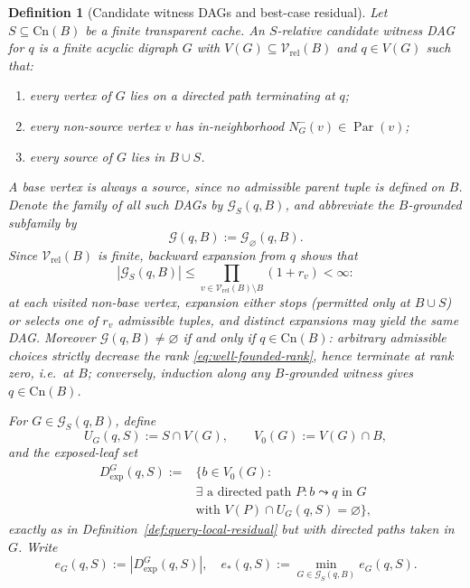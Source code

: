 \documentclass[journal]{IEEEtran}
\newcommand{\Cn}{\text{Cn}}
\newtheorem{definition}{Definition}[section]
\numberwithin{equation}{section}
\begin{document}
\begin{definition}[Candidate witness DAGs and best-case residual]
\label{def:candidate-witness}
Let \(S\subseteq\Cn(B)\) be a finite transparent cache.  An \emph{\(S\)-relative
candidate witness DAG} for \(q\) is a finite acyclic digraph \(G\) with
\(V(G)\subseteq\mathcal V_{\mathrm{rel}}(B)\) and \(q\in V(G)\) such that:
\begin{enumerate}[label=\textup{(\roman*)}]
\item every vertex of \(G\) lies on a directed path terminating at \(q\);
\item every non-source vertex \(v\) has in-neighborhood
\(N_G^{-}(v)\in\operatorname{Par}(v)\);
\item every source of \(G\) lies in \(B\cup S\).
\end{enumerate}
A base vertex is always a source, since no admissible parent tuple is defined
on \(B\).  Denote the family of all such DAGs by \(\mathcal G_S(q,B)\), and
abbreviate the \emph{\(B\)-grounded} subfamily by
\[
  \mathcal G(q,B):=\mathcal G_{\varnothing}(q,B).
\]
Since \(\mathcal V_{\mathrm{rel}}(B)\) is finite, backward expansion from
\(q\) shows that
\begin{equation}
  |\mathcal G_S(q,B)|
  \le
  \prod_{v\in\mathcal V_{\mathrm{rel}}(B)\setminus B}(1+r_v)
  <\infty:
\label{eq:candidate-count-bound}
\end{equation}
at each visited non-base vertex, expansion either stops (permitted only at
\(B\cup S\)) or selects one of \(r_v\) admissible tuples, and distinct
expansions may yield the same DAG.  Moreover
\(\mathcal G(q,B)\neq\varnothing\) if and only if \(q\in\Cn(B)\): arbitrary
admissible choices strictly decrease the rank \eqref{eq:well-founded-rank},
hence terminate at rank zero, i.e.\ at \(B\); conversely, induction along any
\(B\)-grounded witness gives \(q\in\Cn(B)\).

For \(G\in\mathcal G_S(q,B)\), define
\[
  U_G(q,S):=S\cap V(G),
  \qquad
  V_0(G):=V(G)\cap B,
\]
and the exposed-leaf set
\begin{equation}
  \begin{split}
    D_{\mathrm{exp}}^{G}(q,S)
    := &\bigl\{ b\in V_0(G) :  \\
    & \exists\text{ a directed path }P:b\leadsto q\text{ in }G \\
    & \text{with }V(P)\cap U_G(q,S)=\varnothing \bigr\},
  \end{split}
\label{eq:def-exposed-leaves-witness}
\end{equation}
exactly as in Definition~\ref{def:query-local-residual} but with directed
paths taken in \(G\).  Write
\[
  e_G(q,S):=|D_{\mathrm{exp}}^{G}(q,S)|,
  \quad
  e_*(q,S):=\min_{G\in\mathcal G_S(q,B)}e_G(q,S).
\]
\end{definition}
\end{document}
